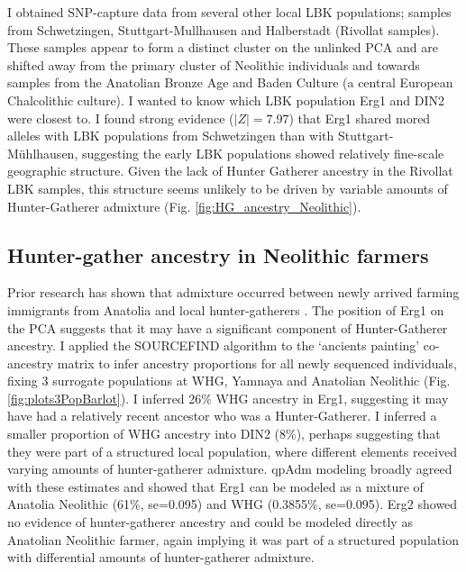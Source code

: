 I obtained SNP-capture data from several other local LBK populations; samples from Schwetzingen, Stuttgart-Mullhausen and Halberstadt (Rivollat samples). These samples appear to form a distinct cluster on the unlinked PCA and are shifted away from the primary cluster of Neolithic individuals and towards samples from the Anatolian Bronze Age and Baden Culture (a central European Chalcolithic culture). I wanted to know which LBK population Erg1 and DIN2 were closest to. I found strong evidence ($|Z| = 7.97$) that Erg1 shared mored alleles with LBK populations from Schwetzingen than with Stuttgart-Mühlhausen, suggesting the early LBK populations showed relatively fine-scale geographic structure. Given the lack of Hunter Gatherer ancestry in the Rivollat LBK samples, this structure seems unlikely to be driven by variable amounts of Hunter-Gatherer admixture (Fig. \ref{fig:HG_ancestry_Neolithic}).


\subsection{Hunter-gather ancestry in Neolithic farmers}

Prior research has shown that admixture occurred between newly arrived farming immigrants from Anatolia and local hunter-gatherers \cite{Gamba2014, Lipson2017b}. The position of Erg1 on the PCA suggests that it may have a significant component of Hunter-Gatherer ancestry. I applied the SOURCEFIND algorithm to the `ancients painting' co-ancestry matrix to infer ancestry proportions for all newly sequenced individuals, fixing 3 surrogate populations at WHG, Yamnaya and Anatolian Neolithic (Fig. \ref{fig:plots3PopBarlot}). I inferred 26\% WHG ancestry in Erg1, suggesting it may have had a relatively recent ancestor who was a Hunter-Gatherer. I inferred a smaller proportion of WHG ancestry into DIN2 (8\%), perhaps suggesting that they were part of a structured local population, where different elements received varying amounts of hunter-gatherer admixture. qpAdm modeling broadly agreed with these estimates and showed that Erg1 can be modeled as a mixture of Anatolia Neolithic (61\%, se=0.095) and WHG (0.3855\%, se=0.095). Erg2 showed no evidence of hunter-gatherer ancestry and could be modeled directly as Anatolian Neolithic farmer, again implying it was part of a structured population with differential amounts of hunter-gatherer admixture. 

